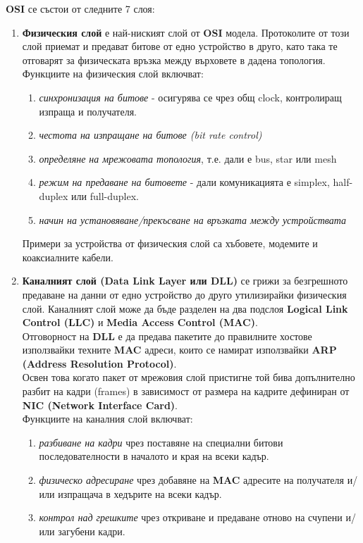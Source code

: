 \documentclass[fleqn,12pt]{article}
\begin{document}
\begin{flushleft}
\textbf{OSI} се състои от следните 7 слоя:
\begin{enumerate}
    \item \textbf{Физическия слой} е най-ниският слой от \textbf{OSI} модела. Протоколите от този слой приемат и предават битове от едно устройство в друго, като така те отговарят за
    физическата връзка между върховете в дадена топология. Функциите на физическия слой включват:
    \begin{enumerate}
        \item \textit{синхронизация на битове} - осигурява се чрез общ clock, контролиращ изпраща и получателя.
        \item \textit{честота на изпращане на битове (bit rate control)}
        \item \textit{определяне на мрежовата топология}, т.е. дали е bus, star или mesh
        \item \textit{режим на предаване на битовете} - дали комуникацията е simplex, half-duplex или full-duplex.
        \item \textit{начин на установяване/прекъсване на връзката между устройствата}
    \end{enumerate}
    Примери за устройства от физическия слой са хъбовете, модемите и коаксиалните кабели.
    \item \textbf{Каналният слой (Data Link Layer или DLL)} се грижи за безгрешното предаване на данни от едно устройство до друго утилизирайки физическия слой.
    Каналният слой може да бъде разделен на два подслоя \textbf{Logical Link Control (LLC)} и \textbf{Media Access Control (MAC)}.\\
    Отговорност на \textbf{DLL} е да предава пакетите до правилните хостове използвайки техните \textbf{MAC} адреси, които се намират използвайки \textbf{ARP (Address Resolution Protocol)}.\\
    Освен това когато пакет от мрежовия слой пристигне той бива допълнително разбит на кадри (frames) в зависимост от размера на кадрите дефиниран от \textbf{NIC (Network Interface Card)}.\\
    Функциите на каналния слой включват:
    \begin{enumerate}
        \item \textit{разбиване на кадри} чрез поставяне на специални битови последователности в началото и края на всеки кадър.
        \item \textit{физическо адресиране} чрез добавяне на \textbf{MAC} адресите на получателя и/или изпращача в хедърите на всеки кадър.
        \item \textit{контрол над грешките} чрез откриване и предаване отново на счупени и/или загубени кадри.

\end{enumerate}
\end{enumerate}
\end{flushleft}
\end{document}
